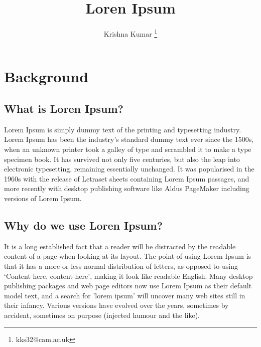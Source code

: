 \documentclass[openright]{book} %
\title {Loren Ipsum}
\author {Krishna Kumar \thanks {kks32@cam.ac.uk}}
\begin{document}
\maketitle
\tableofcontents


\chapter{Background}  %

\section{What is Loren Ipsum?} %

Lorem Ipsum is simply dummy text of the printing and typesetting industry. Lorem Ipsum has been the industry's standard dummy text ever since the 1500s, when an unknown printer took a galley of type and scrambled it to make a type specimen book. It has survived not only five centuries, but also the leap into electronic typesetting, remaining essentially unchanged. It was popularised in the 1960s with the release of Letraset sheets containing Lorem Ipsum passages, and more recently with desktop publishing software like Aldus PageMaker including versions of Lorem Ipsum.

\section{Why do we use Loren Ipsum?} %

It is a long established fact that a reader will be distracted by the readable content of a page when looking at its layout. The point of using Lorem Ipsum is that it has a more-or-less normal distribution of letters, as opposed to using `Content here, content here', making it look like readable English. Many desktop publishing packages and web page editors now use Lorem Ipsum as their default model text, and a search for 'lorem ipsum' will uncover many web sites still in their infancy. Various versions have evolved over the years, sometimes by accident, sometimes on purpose (injected humour and the like).
\end{document}

